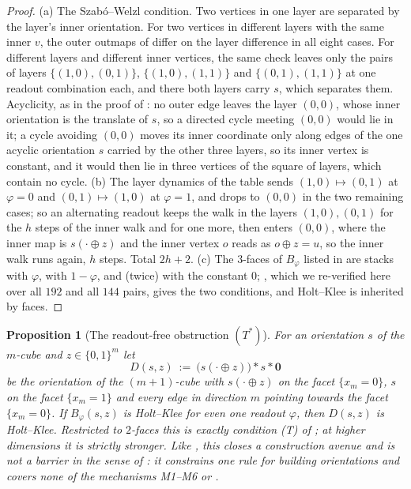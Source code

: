 \documentclass[11pt]{article}
\theoremstyle{plain}
\newtheorem{proposition}[theorem]{Proposition}
\theoremstyle{definition}
\begin{document}
\begin{proof}
(a) The Szab\'o--Welzl condition. Two vertices in one layer are separated
by the layer's inner orientation. For two vertices in different layers with
the same inner $v$, the outer outmaps of  differ on the
layer difference in all eight cases. For different layers and different
inner vertices, the same check leaves only the pairs of layers
$\{(1,0),(0,1)\}$, $\{(1,0),(1,1)\}$ and $\{(0,1),(1,1)\}$ at one readout
combination each, and there both layers carry $s$, which separates them.
Acyclicity, as in the proof of : no outer edge leaves the
layer $(0,0)$, whose inner orientation is the translate of $s$, so a
directed cycle meeting $(0,0)$ would lie in it; a cycle avoiding $(0,0)$
moves its inner coordinate only along edges of the one acyclic
orientation $s$ carried by the other three layers, so its inner vertex is
constant, and it would then lie in three vertices of the square of
layers, which contain no cycle.
(b) The layer dynamics of the table sends $(1,0)\mapsto(0,1)$ at
$\varphi=0$ and $(0,1)\mapsto(1,0)$ at $\varphi=1$, and drops to $(0,0)$
in the two remaining cases; so an alternating readout keeps the walk in
the layers $(1,0),(0,1)$ for the $h$ steps of the inner walk and for one
more, then enters $(0,0)$, where the inner map is $s(\cdot\oplus z)$ and
the inner vertex $o$ reads as $o\oplus z=u$, so the inner walk runs again,
$h$ steps. Total $2h+2$.
(c) The $3$-faces of $B_\varphi$ listed in  are
stacks with $\varphi$, with $1-\varphi$, and (twice) with the constant
$0$; , which we re-verified here over all $192$ and all
$144$ pairs, gives the two conditions, and Holt--Klee is inherited by
faces.
\end{proof}

\begin{proposition}[The readout-free obstruction $(T^{\ast})$]\label{prop:tstar}
For an orientation $s$ of the $m$-cube and $z\in\{0,1\}^{m}$ let
\[
  D(s,z)\ :=\ \bigl(s(\cdot\oplus z)\bigr)\!*\!s\!*\!\mathbf 0
\]
be the orientation of the $(m+1)$-cube with $s(\cdot\oplus z)$ on the
facet $\{x_m=0\}$, $s$ on the facet $\{x_m=1\}$ and every edge in
direction $m$ pointing towards the facet $\{x_m=0\}$. If $B_\varphi(s,z)$
is Holt--Klee for even one readout $\varphi$, then $D(s,z)$ is Holt--Klee.
Restricted to $2$-faces this is exactly condition \emph{(T)} of
; at higher dimensions it is strictly stronger.
Like , this closes a construction avenue and is
not a barrier in the sense of : it constrains one rule for
building orientations and covers none of the mechanisms M1--M6 or
.
\end{proposition}
\end{document}
